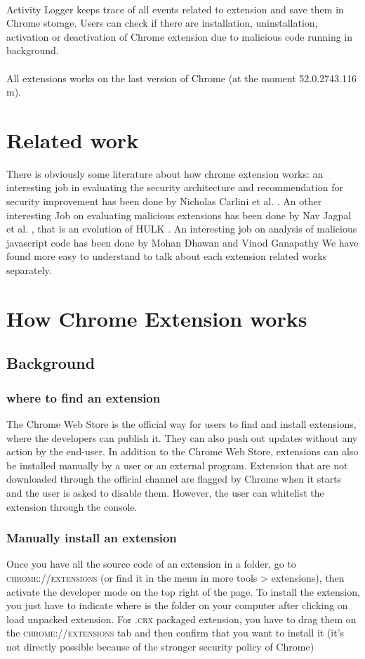 \documentclass[12pt]{article}
\begin{document}
\begin{multicols}{2}
	\paragraph{}Activity Logger keeps trace of all events related to extension and save them in Chrome storage. Users can check if there are installation, uninstallation, activation or deactivation of Chrome extension due to malicious code running in background.
	\paragraph{}All extensions works on the last version of Chrome (at the moment 52.0.2743.116 m).
	\section*{Related work}
	There is obviously some literature about how chrome extension works: an interesting job in evaluating the security architecture and recommendation for security improvement has been done by Nicholas Carlini et al. \cite{Carlini}. An other interesting Job on evaluating malicious extensions has been done by Nav Jagpal et al. \cite{Nav}, that is an evolution of HULK \cite{HULK}. An interesting job on analysis of malicious javascript code has been done by Mohan Dhawan and Vinod Ganapathy \cite{Java}
	We have found more easy to understand to talk about each extension related works separately.
\section*{How Chrome Extension works}
\subsection*{Background}
\subsubsection*{where to find an extension}
The Chrome Web Store is the official way for users
to find and install extensions, where the developers can publish it. They can also push out updates without any action
by the end-user.
In addition to the Chrome Web Store, extensions can
also be installed manually by a user or an external program.
Extension that are not downloaded through the official channel are flagged by Chrome when it starts	and the user is asked to disable them.
However, the user can whitelist the extension through the console.
\subsubsection*{Manually install an extension}
	Once you have all the source code of an extension in a folder, go to  \textsc{chrome://extensions} (or find it in the menu in more tools > extensions), then activate the developer mode on the top right of the page. To install the extension, you just have to indicate where is the folder on your computer after clicking on load unpacked extension. For \textsc{.crx} packaged extension, you have to drag them on the \textsc{chrome://extensions} tab and then confirm that you want to install it (it's not directly possible because of the stronger security policy of Chrome)

\end{multicols}
\end{document}
